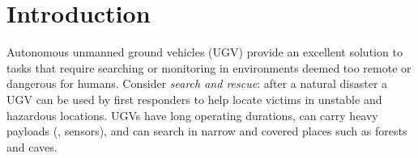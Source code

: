 

\section{Introduction}


Autonomous unmanned ground vehicles (UGV) provide an excellent solution to tasks that require searching or monitoring in environments deemed too remote or dangerous for humans.
%
Consider \emph{search and rescue}: after a natural disaster a UGV can be used by first responders to help locate victims in unstable and hazardous locations.
%
UGVs have long operating durations, can carry heavy payloads (\eg{}, sensors), and can search in narrow and covered places such as forests and caves.
%
%


